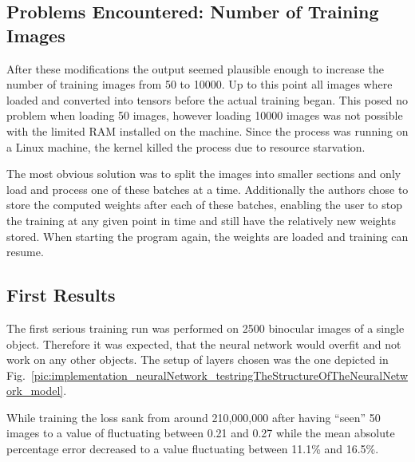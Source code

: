 \subsection{Problems Encountered: Number of Training Images}
After these modifications the output seemed plausible enough to increase the number of training images from 50 to 10000. Up to this point all images where loaded and converted into tensors before the actual training began. This posed no problem when loading 50 images, however loading 10000 images was not possible with the limited RAM installed on the machine. Since the process was running on a Linux machine, the kernel killed the process due to resource starvation.

The most obvious solution was to split the images into smaller sections and only load and process one of these batches at a time. Additionally the authors chose to store the computed weights after each of these batches, enabling the user to stop the training at any given point in time and still have the relatively new weights stored. When starting the program again, the weights are loaded and training can resume.

\subsection{First Results}
The first serious training run was performed on 2500 binocular images of a single object. Therefore it was expected, that the neural network would overfit and not work on any other objects. The setup of layers chosen was the one depicted in Fig.~\ref{pic:implementation_neuralNetwork_testringTheStructureOfTheNeuralNetwork_model}.

While training the loss sank from around 210,000,000 after having ``seen'' 50 images to a value of fluctuating between 0.21 and 0.27 while the mean absolute percentage error decreased to a value fluctuating between 11.1\% and 16.5\%.

